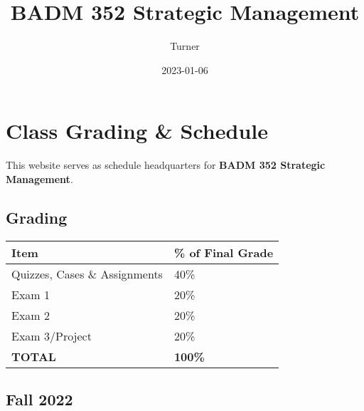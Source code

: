 \documentclass[
]{book}
\title{BADM 352 Strategic Management}
\author{Turner}
\date{2023-01-06}
\begin{document}
\maketitle

{
\setcounter{tocdepth}{1}
\tableofcontents
}
\hypertarget{class-grading-schedule}{%
\chapter*{Class Grading \& Schedule}\label{class-grading-schedule}}

This website serves as schedule headquarters for \textbf{BADM 352 Strategic Management}.

\hypertarget{grading}{%
\section*{Grading}\label{grading}}

\begin{longtable}[]{@{}ll@{}}
\toprule()
Item & \% of Final Grade \\
\midrule()
\endhead
Quizzes, Cases \& Assignments & 40\% \\
Exam 1 & 20\% \\
Exam 2 & 20\% \\
Exam 3/Project & 20\% \\
\textbf{TOTAL} & \textbf{100\%} \\
\bottomrule()
\end{longtable}

\hypertarget{fall-2022}{%
\section*{Fall 2022}\label{fall-2022}}
\end{document}
